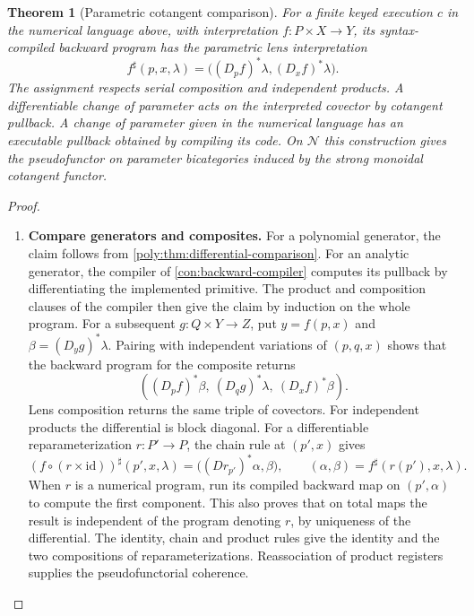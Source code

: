 \documentclass[11pt,a4paper]{article}
\newtheorem{theorem}{Theorem}[section]
\theoremstyle{definition}
\theoremstyle{remark}\newaliascnt{remark}{theorem}
\newcommand{\id}{\mathrm{id}}
\numberwithin{equation}{section}
\begin{document}
\begin{theorem}[Parametric cotangent comparison]\label{thm:para-lens}
For a finite keyed execution $c$ in the numerical language above, with interpretation $f:P\times X\to Y$, its syntax-compiled backward program has the parametric lens interpretation
\[
 f^\sharp(p,x,\lambda)=\big((D_p f)^*\lambda,(D_x f)^*\lambda\big).
\]
The assignment respects serial composition and independent products. A differentiable change of parameter acts on the interpreted covector by cotangent pullback. A change of parameter given in the numerical language has an executable pullback obtained by compiling its code. On $\mathcal N$ this construction gives the pseudofunctor on parameter bicategories induced by the strong monoidal cotangent functor.
\end{theorem}
\begin{proof}\leavevmode
\begin{enumerate}[titledsteps]
    \item \textbf{Compare generators and composites.} For a polynomial generator, the claim follows from \cref{poly:thm:differential-comparison}. For an analytic generator, the compiler of \cref{con:backward-compiler} computes its pullback by differentiating the implemented primitive. The product and composition clauses of the compiler then give the claim by induction on the whole program. For a subsequent $g:Q\times Y\to Z$, put $y=f(p,x)$ and $\beta=(D_y g)^*\lambda$. Pairing with independent variations of $(p,q,x)$ shows that the backward program for the composite returns
\[
 ((D_pf)^*\beta,\ (D_qg)^*\lambda,\ (D_xf)^*\beta).
\]
Lens composition returns the same triple of covectors. For independent products the differential is block diagonal. For a differentiable reparameterization $r:P'\to P$, the chain rule at $(p',x)$ gives
\[
  (f\circ(r\times\id))^\sharp(p',x,\lambda)
   =\bigl((Dr_{p'})^*\alpha,\beta\bigr),\qquad
  (\alpha,\beta)=f^\sharp(r(p'),x,\lambda).
\]
When $r$ is a numerical program, run its compiled backward map on $(p',\alpha)$ to compute the first component. This also proves that on total maps the result is independent of the program denoting $r$, by uniqueness of the differential. The identity, chain and product rules give the identity and the two compositions of reparameterizations. Reassociation of product registers supplies the pseudofunctorial coherence.



\end{enumerate}
\end{proof}
\end{document}

